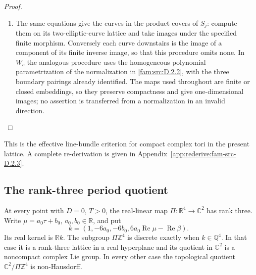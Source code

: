 \begin{proof}
\begin{enumerate}[label=\arabic*.,leftmargin=*]
\item The same equations give the curves in the product covers of $S_j$:
compute them on its two-elliptic-curve lattice and take images under the
specified finite morphism. Conversely each curve downstairs is the image
of a component of its finite inverse image, so that this procedure omits
none. In $W_c$ the analogous procedure uses the homogeneous polynomial
parametrization of the normalization in \ref{fam:src:D.2.2}, with the three boundary
pairings already identified. The maps used throughout are finite or
closed embeddings, so they preserve compactness and give one-dimensional
images; no assertion is transferred from a normalization in an invalid
direction.
\end{enumerate}
\end{proof}



This is the effective line-bundle criterion for compact complex tori in the present lattice. A complete re-derivation is given in Appendix~\ref{app:rederive:fam-src-D.2.3}.




\subsection{The rank-three period quotient}\hypertarget{tag-01PN}{}\label{fam:section:C.3}
\begin{proposition}\hypertarget{tag-01QM}{}\label{fam:src:C.3.1}\label{fam:st:C.3.1}

At every point with \(D=0\), \(T>0\), the real-linear map
\(\Pi:\mathbb R^4\to\mathbb C^2\) has rank three. Write
\(\mu=a_0\tau+b_0\), \(a_0,b_0\in\mathbb R\), and put
\[
 k=(1,-6a_0,-6b_0,6a_0\operatorname{Re}\mu-\operatorname{Re}\beta).
\]
Its real kernel is \(\mathbb R k\). The subgroup \(\Pi\mathbb Z^4\) is
discrete exactly when \(k\in\mathbb Q^4\). In that case it is a
rank-three lattice in a real hyperplane and its quotient in \(\mathbb C^2\)
is a noncompact complex Lie group. In every other case the topological
quotient \(\mathbb C^2/\Pi\mathbb Z^4\) is non-Hausdorff.
\end{proposition}


